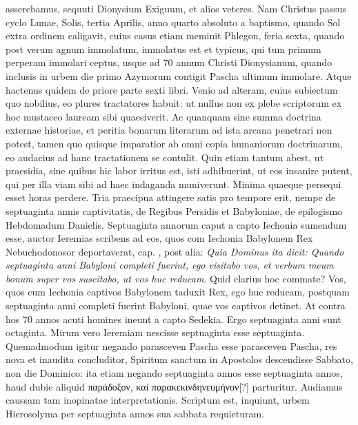 asserebamus, sequuti Dionysium Exiguum, et alios veteres.
Nam Christus passus cyclo  Lunae,  Solis,
 tertia Aprilis,
anno quarto absoluto a baptismo, quando Sol extra ordinem caligavit,
cuius casus etiam meminit Phlegon, feria sexta, quando
post verum agnum immolatum, immolatus est et typicus, qui tum
primum perperam immolari ceptus, usque ad 70 annum Christi
Dionysianum, quando inclusis in urbem die primo Azymorum
contigit Pascha ultimum immolare.
%
Atque hactenus quidem de
priore parte sexti libri.
Venio ad alteram, cuius subiectum quo nobilius,
eo plures tractatores habuit: ut nullus non ex plebe scriptorum
ex hoc mustaceo lauream sibi quaesiverit.
Ac quanquam sine
summa doctrina externae historiae, et peritia bonarum literarum
ad ista arcana penetrari non potest, tamen quo quisque imparatior
ab omni copia humaniorum doctrinarum, eo audacius ad hanc
tractationem se contulit.
Quin etiam tantum abest, ut praesidia,
sine quibus hic labor irritus est, isti adhibuerint, ut eos insanire
putent, qui per illa viam sibi ad haec indaganda muniverunt.
Minima quaeque persequi esset horas perdere.
Tria praecipua attingere
satis pro tempore erit, nempe de septuaginta annis captivitatis,
de Regibus Persidis et Babyloniae, de epilogismo Hebdomadum
Danielis.
Septuaginta annorum caput a capto Iechonia sumendum
esse, auctor Ieremias scribens ad eos, quos com Iechonia Babylonem
Rex Nebuchodonosor deportaverat, cap. , post
alia: \textit{Quia Dominus ita dicit: Quando septuaginta anni Babyloni completi
fuerint, ego visitabo vos, et verbum meum bonum super vos
suscitabo, ut vos huc reducam}.
Quid clarius hoc commate?
Vos,
quos cum Iechonia captivos Babylonem taduxit Rex, ego huc
reducam, postquam septuaginta anni completi fuerint Babyloni,
quae vos captivos detinet.
At contra hos 70 annos acuti homines
ineunt a capto Sedekia.
Ergo septuaginta anni sunt octaginta.
Mirum vero Ieremiam nescisse septuaginta esse septuaginta.
Quemadmodum
igitur negando parasceven Pascha esse parasceven
Pascha, res nova et inaudita concluditor, Spiritum sanctum in 
Apostolos descendisse Sabbato, non die Dominico: ita etiam
negando septuaginta annos esse septuaginta annos, haud dubie
aliquid \textgreek{παράδοξον, καὶ παρακεκινδηνευμήνον[?]} parturitur.
Audiamus
caussam tam inopinatae interpretationis.
Scriptum est, inquiunt, urbem
Hierosolyma per septuaginta annos sua sabbata requieturam.
